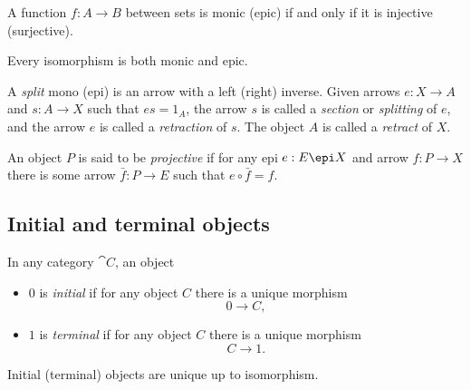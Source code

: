 \documentclass{article}
\begin{document}
\begin{proposition}
    A function $f:A\to B$ between sets is monic (epic) if and only if it is injective (surjective).
\end{proposition}

\begin{proposition}
    Every isomorphism is both monic and epic.
\end{proposition}

\begin{definition}
    A \emph{split} mono (epi) is an arrow with a left (right) inverse. Given
    arrows $e:X\to A$ and $s:A\to X$ such that $es=1_A$, the arrow $s$ is called
    a \emph{section} or \emph{splitting} of $e$, and the arrow $e$ is called a
    \emph{retraction} of $s$. The object $A$ is called a \emph{retract} of $X$.
\end{definition}

\begin{definition}
    An object $P$ is said to be \emph{projective} if for any epi $e:E\epi X$
    and arrow $f:P\to X$ there is some arrow $\bar f:P\to E$ such that
    $e\circ \bar f = f$.
\end{definition}

\subsection{Initial and terminal objects}

\begin{definition}
    In any category $\cat C$, an object
    \begin{itemize}
        \item $0$ is \emph{initial} if for any object $C$ there is a unique morphism
        \[0\to C,\]
        \item $1$ is \emph{terminal} if for any object $C$ there is a unique morphism
        \[C\to 1.\]
    \end{itemize}
\end{definition}

\begin{proposition}
    Initial (terminal) objects are unique up to isomorphism.    
\end{proposition}
\end{document}
